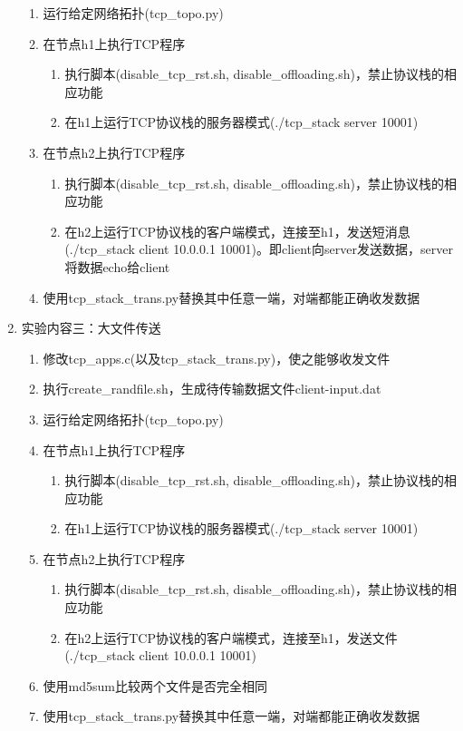 \documentclass[UTF8]{report}
\begin{document}
\begin{enumerate}
\begin{enumerate}[label=(\arabic*)]
        \item 运行给定网络拓扑(tcp_topo.py)
        \item 在节点h1上执行TCP程序
        \begin{enumerate}
            \item 执行脚本(disable_tcp_rst.sh, disable_offloading.sh)，禁止协议栈的相应功能
            \item 在h1上运行TCP协议栈的服务器模式(./tcp_stack server 10001)
        \end{enumerate}
        \item 在节点h2上执行TCP程序
        \begin{enumerate}
            \item 执行脚本(disable_tcp_rst.sh, disable_offloading.sh)，禁止协议栈的相应功能
            \item 在h2上运行TCP协议栈的客户端模式，连接至h1，发送短消息(./tcp_stack client 10.0.0.1 10001)。即client向server发送数据，server将数据echo给client
        \end{enumerate}
        \item 使用tcp_stack_trans.py替换其中任意一端，对端都能正确收发数据
    \end{enumerate}
    \item 实验内容三：大文件传送
    \begin{enumerate}[label=(\arabic*)]
        \item 修改tcp_apps.c(以及tcp_stack_trans.py)，使之能够收发文件
        \item 执行create_randfile.sh，生成待传输数据文件client-input.dat
        \item 运行给定网络拓扑(tcp_topo.py)
        \item 在节点h1上执行TCP程序
        \begin{enumerate}
            \item 执行脚本(disable_tcp_rst.sh, disable_offloading.sh)，禁止协议栈的相应功能
            \item 在h1上运行TCP协议栈的服务器模式(./tcp_stack server 10001)
        \end{enumerate}
        \item 在节点h2上执行TCP程序
        \begin{enumerate}
            \item 执行脚本(disable_tcp_rst.sh, disable_offloading.sh)，禁止协议栈的相应功能
            \item 在h2上运行TCP协议栈的客户端模式，连接至h1，发送文件(./tcp_stack client 10.0.0.1 10001)
        \end{enumerate}
        \item 使用md5sum比较两个文件是否完全相同
        \item 使用tcp_stack_trans.py替换其中任意一端，对端都能正确收发数据
    \end{enumerate}
\end{enumerate}
\end{document}
